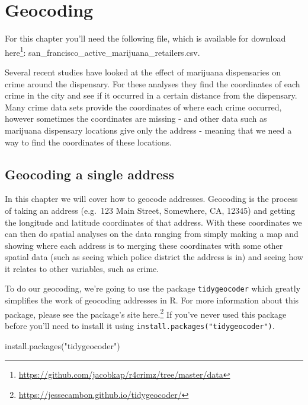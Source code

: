 \documentclass[
  a4paper,
]{krantz}
\makeatletter
\newenvironment{Shaded}{\begin{snugshade}}{\end{snugshade}}
\newcommand{\FunctionTok}[1]{\textcolor[rgb]{0,0,0}{#1}}
\newcommand{\NormalTok}[1]{#1}
\newcommand{\StringTok}[1]{\textcolor[rgb]{0.5,0.5,0.5}{#1}}
\renewcommand{\href}[2]{#2\footnote{\url{#1}}}
\newenvironment{kframe}{%
\medskip{}
\setlength{\fboxsep}{.8em}
 \def\at@end@of@kframe{}%
 \ifinner\ifhmode%
  \def\at@end@of@kframe{\end{minipage}}%
  \begin{minipage}{\columnwidth}%
 \fi\fi%
 \def\FrameCommand##1{\hskip\@totalleftmargin \hskip-\fboxsep
 \colorbox{shadecolor}{##1}\hskip-\fboxsep
     \hskip-\linewidth \hskip-\@totalleftmargin \hskip\columnwidth}%
 \MakeFramed {\advance\hsize-\width
   \@totalleftmargin\z@ \linewidth\hsize
   \@setminipage}}%
 {\par\unskip\endMakeFramed%
 \at@end@of@kframe}
\renewenvironment{Shaded}{\begin{kframe}}{\end{kframe}}
\makeatother
\begin{document}
\hypertarget{geocoding}{%
\chapter{Geocoding}\label{geocoding}}

For this chapter you'll need the following file, which is
available for download
\href{https://github.com/jacobkap/r4crimz/tree/master/data}{here}:
san\_francisco\_active\_marijuana\_retailers.csv.

Several recent studies have looked at the effect of
marijuana dispensaries on crime around the dispensary. For
these analyses they find the coordinates of each crime in
the city and see if it occurred in a certain distance from
the dispensary. Many crime data sets provide the coordinates
of where each crime occurred, however sometimes the
coordinates are missing - and other data such as marijuana
dispensary locations give only the address - meaning that we
need a way to find the coordinates of these locations.

\hypertarget{geocoding-a-single-address}{%
\section{Geocoding a single
address}\label{geocoding-a-single-address}}

In this chapter we will cover how to geocode addresses.
Geocoding is the process of taking an address (e.g.~123 Main
Street, Somewhere, CA, 12345) and getting the longitude and
latitude coordinates of that address. With these coordinates
we can then do spatial analyses on the data ranging from
simply making a map and showing where each address is to
merging these coordinates with some other spatial data (such
as seeing which police district the address is in) and
seeing how it relates to other variables, such as crime.

To do our geocoding, we're going to use the package
\texttt{tidygeocoder} which greatly simplifies the work of
geocoding addresses in R. For more information about this
package, please see the package's site
\href{https://jessecambon.github.io/tidygeocoder/}{here.} If
you've never used this package before you'll need to install
it using \texttt{install.packages("tidygeocoder")}.

\begin{Shaded}
\begin{Highlighting}[]
\FunctionTok{install.packages}\NormalTok{(}\StringTok{"tidygeocoder"}\NormalTok{)}
\end{Highlighting}
\end{Shaded}
\end{document}
